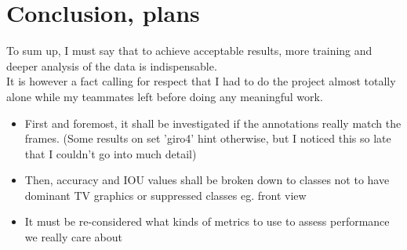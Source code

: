 \documentclass{article}
\begin{document}
\section{Conclusion, plans}

To sum up, I must say that to achieve acceptable results, more training and deeper analysis of the data is indispensable. \\

It is however a fact calling for respect that I had to do the project almost totally alone while my teammates left before doing any meaningful work.

\begin{itemize}

    \item First and foremost, it shall be investigated if the annotations really match the frames. (Some results on set 'giro4' hint otherwise, but I noticed this so late that I couldn't go into much detail)

    \item Then, accuracy and IOU values shall be broken down to classes not to have dominant TV graphics or suppressed classes eg. front view
    
    \item It must be re-considered what kinds of metrics to use to assess performance we really care about 
    
\end{itemize}
\end{document}
